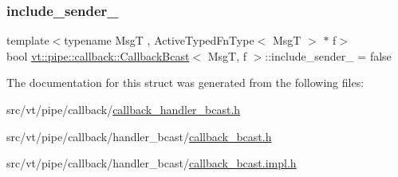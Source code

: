 \subsubsection{\texorpdfstring{include\+\_\+sender\+\_\+}{include\_sender\_}}
{\footnotesize\ttfamily template$<$typename MsgT , Active\+Typed\+Fn\+Type$<$ Msg\+T $>$ $\ast$ f$>$ \\
bool \hyperlink{structvt_1_1pipe_1_1callback_1_1_callback_bcast}{vt\+::pipe\+::callback\+::\+Callback\+Bcast}$<$ MsgT, f $>$\+::include\+\_\+sender\+\_\+ = false\hspace{0.3cm}{\ttfamily [private]}}



The documentation for this struct was generated from the following files\+:\begin{DoxyCompactItemize}
\item 
src/vt/pipe/callback/\hyperlink{callback__handler__bcast_8h}{callback\+\_\+handler\+\_\+bcast.\+h}\item 
src/vt/pipe/callback/handler\+\_\+bcast/\hyperlink{callback__bcast_8h}{callback\+\_\+bcast.\+h}\item 
src/vt/pipe/callback/handler\+\_\+bcast/\hyperlink{callback__bcast_8impl_8h}{callback\+\_\+bcast.\+impl.\+h}\end{DoxyCompactItemize}
